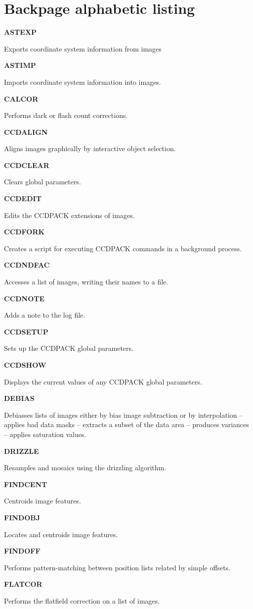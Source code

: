 \documentclass[twoside,11pt]{article}
\newenvironment{latexonly}{}{}
\renewcommand{\_}{\texttt{\symbol{95}}}
\newcommand{\quickdes}[3]{
                         \parbox{1.1in}{\bf #1}
                         \parbox{4.4in}{\raggedright #2 \dotfill}
                         \parbox{0.6in}{\pageref{#3}}
                         \vspace*{0.2in}}
\newcommand{\latexonlysection}[1]{\section{#1}}
\newcommand{\latexonlysection}[1]{#1}
\begin{document}
\begin{latexonly}
\newpage
\latexonlysection{Backpage alphabetic listing}

\quickdes{ASTEXP}{Exports coordinate system information from images}
         {ASTEXP}

\quickdes{ASTIMP}{Imports coordinate system information into images.}{ASTIMP}

\quickdes{CALCOR}{Performs dark or flash count corrections.}{CALCOR}

\quickdes{CCDALIGN}{Aligns images graphically by interactive object selection.}
         {CCDALIGN}

\quickdes{CCDCLEAR}{Clears global parameters.}
         {CCDCLEAR}

\quickdes{CCDEDIT}{Edits the CCDPACK extensions of images.}
         {CCDEDIT}

\quickdes{CCDFORK}{Creates a script for executing CCDPACK
                   commands in a background process.}{CCDFORK}

\quickdes{CCDNDFAC}{Accesses a list of images, writing their names to a file.}
         {CCDNDFAC}

\quickdes{CCDNOTE}{Adds a note to the log file.}{CCDNOTE}

\quickdes{CCDSETUP}{Sets up the CCDPACK global parameters.}{CCDSETUP}

\quickdes{CCDSHOW}{Displays the current values of any CCDPACK global
                   parameters.}{CCDSHOW}

\quickdes{DEBIAS}{Debiasses lists of images either by bias image
                 subtraction or by interpolation --
                 applies bad data masks --
                 extracts a subset of the data area --
                 produces variances --
                 applies saturation values.}
                 {DEBIAS}

\quickdes{DRIZZLE}{Resamples and mosaics using the drizzling algorithm.}
                  {DRIZZLE}

\quickdes{FINDCENT}{Centroids image features.}
                   {FINDCENT}

\quickdes{FINDOBJ}{Locates and centroids image features.}
                  {FINDOBJ}

\quickdes{FINDOFF}{Performs pattern-matching between position lists
                   related by simple offsets.}
                   {FINDOFF}

\quickdes{FLATCOR}{Performs the flatfield correction on a list of images.}
                  {FLATCOR}

\end{latexonly}
\end{document}
